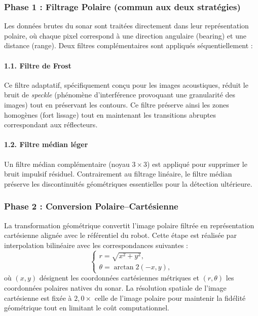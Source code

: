 \subsubsection*{Phase 1 : Filtrage Polaire (commun aux deux stratégies)}

Les données brutes du sonar sont traitées directement dans leur représentation polaire, où chaque pixel correspond à une direction angulaire (bearing) et une distance (range). Deux filtres complémentaires sont appliqués séquentiellement :

\paragraph{1.1. Filtre de Frost} Ce filtre adaptatif, spécifiquement conçu pour les images acoustiques, réduit le bruit de \textit{speckle} (phénomène d'interférence provoquant une granularité des images) tout en préservant les contours. Ce filtre préserve ainsi les zones homogènes (fort lissage) tout en maintenant les transitions abruptes correspondant aux réflecteurs.

\paragraph{1.2. Filtre médian léger} Un filtre médian complémentaire (noyau $3 \times 3$) est appliqué pour supprimer le bruit impulsif résiduel. Contrairement au filtrage linéaire, le filtre médian préserve les discontinuités géométriques essentielles pour la détection ultérieure.

\subsubsection*{Phase 2 : Conversion Polaire--Cartésienne}

La transformation géométrique convertit l'image polaire filtrée en représentation cartésienne alignée avec le référentiel du robot. Cette étape est réalisée par interpolation bilinéaire avec les correspondances suivantes :
\[
\begin{cases}
r = \sqrt{x^2 + y^2}, \\[3pt]
\theta = \arctan2(-x, y),
\end{cases}
\]
où $(x, y)$ désignent les coordonnées cartésiennes métriques et $(r, \theta)$ les coordonnées polaires natives du sonar. La résolution spatiale de l'image cartésienne est fixée à $2{,}0 \times$ celle de l'image polaire pour maintenir la fidélité géométrique tout en limitant le coût computationnel.

